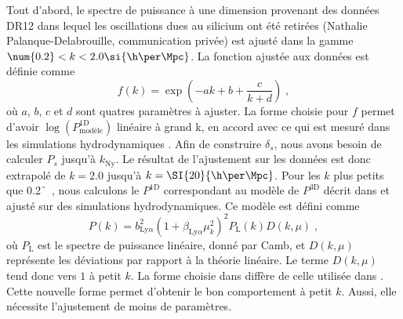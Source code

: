 Tout d'abord, le spectre de puissance à une dimension provenant des données DR12 dans lequel les oscillations dues au silicium ont été retirées (Nathalie Palanque-Delabrouille, communication privée) est ajusté dans la gamme $\num{0.2} < k < {2.0} \si{\h\per\Mpc}$.
La fonction ajustée aux données est définie comme
\begin{equation}
  \label{eq:p1d_data}
  f(k) = \exp(- a k + b + \frac{c}{k + d})  \; ,
\end{equation}
où $a$, $b$, $c$ et $d$ sont quatres paramètres à ajuster.
La forme choisie pour $f$ permet d'avoir $\log(P^{\mathrm{1D}}_{\mathrm{modèle}})$ linéaire à grand k, en accord avec ce qui est mesuré dans les simulations hydrodynamiques \autocite{Arinyo-i-Prats2015}.
Afin de construire $\delta_s$, nous avons besoin de calculer $P_{s}$ jusqu'à $k_{\mathrm{Ny}}$.
Le résultat de l'ajustement sur les données est donc extrapolé de $k = \num{2.0}$ jusqu'à $k = \SI{20}{\h\per\Mpc}$.
Pour les $k$ plus petits que \SI{0.2}{\h\per\Mpc}, nous calculons le $P^{\mathrm{1D}}$ correspondant au modèle de $P^{\mathrm{3D}}$ décrit dans \textcite{Arinyo-i-Prats2015} et ajusté sur des simulations hydrodynamiques.
Ce modèle est défini comme
\begin{equation}
  P(k) = b_{\mathrm{Ly}\alpha}^2 (1 + \beta_{\mathrm{Ly}\alpha} \mu_k^2)^2 P_{\mathrm{L}}(k) D(k, \mu) \; ,
\end{equation}
où $P_{\mathrm{L}}$ est le spectre de puissance linéaire, donné par Camb, et $D(k,\mu)$ représente les déviations par rapport à la théorie linéaire. Le terme $D(k,\mu)$ tend donc vers $1$ à petit $k$. La forme choisie dans \textcite{Arinyo-i-Prats2015} diffère de celle utilisée dans \textcite{McDonald2003}. Cette nouvelle forme permet d'obtenir le bon comportement à petit $k$. Aussi, elle nécessite l'ajustement de moins de paramètres.
